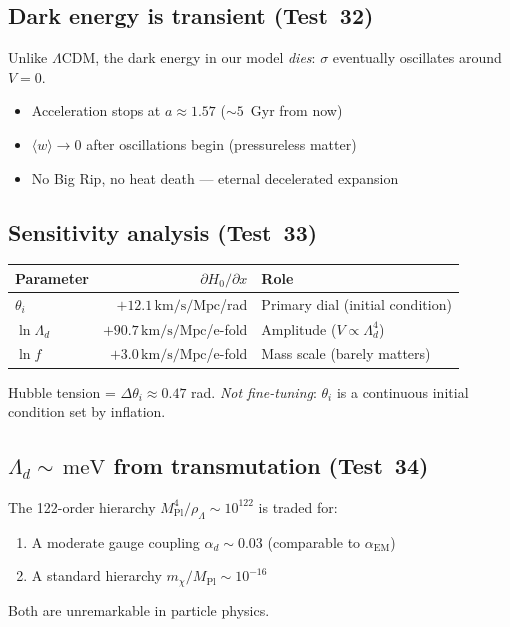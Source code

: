 \documentclass[11pt,a4paper]{article}
\newcommand{\Mpl}{M_{\mathrm{Pl}}}
\newcommand{\Ld}{\Lambda_d}
\newcommand{\meV}{\,\mathrm{meV}}
\newcommand{\kms}{\,\mathrm{km/s/Mpc}}
\begin{document}
\subsection{Dark energy is transient (Test~32)}
Unlike $\Lambda$CDM, the dark energy in our model \emph{dies}: $\sigma$ eventually oscillates around $V=0$.
\begin{itemize}[nosep]
  \item Acceleration stops at $a\approx1.57$ ($\sim5$~Gyr from now)
  \item $\langle w\rangle\to 0$ after oscillations begin (pressureless matter)
  \item No Big Rip, no heat death --- eternal decelerated expansion
\end{itemize}

\subsection{Sensitivity analysis (Test~33)}
\begin{center}
\begin{tabular}{@{}lrl@{}}
\toprule
Parameter & $\partial H_0/\partial x$ & Role \\
\midrule
$\theta_i$ & $+12.1\kms$/rad & Primary dial (initial condition) \\
$\ln\Ld$ & $+90.7\kms$/e-fold & Amplitude ($V\propto\Ld^4$) \\
$\ln f$ & $+3.0\kms$/e-fold & Mass scale (barely matters) \\
\bottomrule
\end{tabular}
\end{center}
Hubble tension = $\Delta\theta_i\approx0.47$ rad. \emph{Not fine-tuning}: $\theta_i$ is a continuous initial condition set by inflation.

\subsection{$\Ld\sim\meV$ from transmutation (Test~34)}
The 122-order hierarchy $\Mpl^4/\rho_\Lambda \sim 10^{122}$ is traded for:
\begin{enumerate}[nosep]
  \item A moderate gauge coupling $\alpha_d\sim0.03$ (comparable to $\alpha_{\mathrm{EM}}$)
  \item A standard hierarchy $m_\chi/\Mpl\sim10^{-16}$
\end{enumerate}
Both are unremarkable in particle physics.
\end{document}
